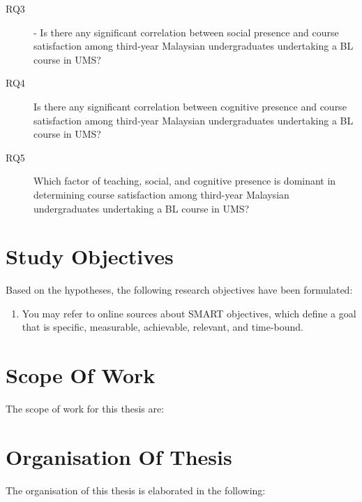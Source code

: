 \begin{description}
    \item[RQ3] - Is there any significant correlation between social presence and course satisfaction among third-year Malaysian undergraduates undertaking a BL course in UMS?
    \item[RQ4] Is there any significant correlation between cognitive presence and course satisfaction among third-year Malaysian undergraduates undertaking a BL course in UMS?
    \item[RQ5] Which factor of teaching, social, and cognitive presence is dominant in determining course satisfaction among third-year Malaysian undergraduates undertaking a BL course in UMS?
\end{description}

\section{Study Objectives}



Based on the hypotheses, the following research objectives have been formulated:

\begin{enumerate}    
    \item  You may refer to online sources about SMART objectives, which define a goal that is specific, measurable, achievable, relevant, and time-bound.


       


    
\end{enumerate}



\section{Scope Of Work}

The scope of work for this thesis are:

\begin{enumerate}    


	
\end{enumerate}

\section{Organisation Of Thesis}
\label{ThesisOrganisation}


\noindent The organisation of this thesis is elaborated in the following:


